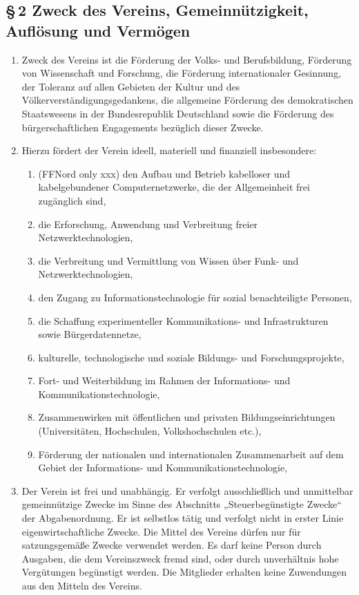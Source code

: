 \documentclass[12pt,a4paper]{article}
\begin{document}
\subsection*{§\,2 Zweck des Vereins, Gemeinnützigkeit, Auflösung und Vermögen}
\begin{enumerate}
\item Zweck des Vereins ist die Förderung der Volks- und Berufsbildung, Förderung von Wissenschaft und Forschung, die Förderung internationaler Gesinnung, der Toleranz auf allen Gebieten der Kultur und des Völkerverständigungsgedankens, die allgemeine Förderung des demokratischen Staatswesens in der Bundesrepublik Deutschland sowie die Förderung des bürgerschaftlichen Engagements bezüglich dieser Zwecke.
\item Hierzu fördert der Verein ideell, materiell und finanziell insbesondere:
\begin{enumerate}
\item (FFNord only xxx) den Aufbau und Betrieb kabelloser und kabelgebundener Computernetzwerke, die der Allgemeinheit frei zugänglich sind,
\item die Erforschung, Anwendung und Verbreitung freier Netz\-werktechnologien,
\item die Verbreitung und Vermittlung von Wissen über Funk- und Netz\-werktechnologien,
\item den Zugang zu Informationstechnologie für sozial benachteiligte Personen,
\item die Schaffung experimenteller Kommunikations- und Infrastrukturen sowie Bürgerdatennetze,
\item kulturelle, technologische und soziale Bildungs- und Forschungsprojekte,
\item Fort- und Weiterbildung im Rahmen der Informations- und Kommunikationstechnologie,
\item Zusammenwirken mit öffentlichen und privaten Bildungseinrichtungen (Universitäten, Hochschulen, Volkshochschulen etc.),
\item Förderung der nationalen und internationalen Zusammenarbeit auf dem Gebiet der Informations- und Kommunikationstechnologie,
\end{enumerate}
\item Der Verein ist frei und unabhängig. Er verfolgt ausschließlich und unmittelbar gemeinnützige Zwecke im Sinne des Abschnitts „Steuerbegünstigte Zwecke“ der Abgabenordnung. Er ist selbstlos tätig und verfolgt nicht in erster Linie eigenwirtschaftliche Zwecke. Die Mittel des Vereins dürfen nur für satzungsgemäße Zwecke verwendet werden. Es darf keine Person durch Ausgaben, die dem Vereinszweck fremd sind, oder durch unverhältnis hohe Vergütungen begünstigt werden. Die Mitglieder erhalten keine Zuwendungen aus den Mitteln des Vereins.

\end{enumerate}
\end{document}
